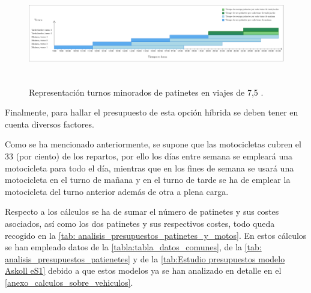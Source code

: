 \begin{figure}[H]
    \centering
    \includegraphics[width= \textwidth, height=12em]{archivos/caso1_patinetes.pdf}
    \caption{Representación turnos minorados de patinetes en viajes de 7,5 .}
    \label{fig:patinetes_caso2_2}
\end{figure}

Finalmente, para hallar el presupuesto de esta opción híbrida se deben tener en cuenta diversos factores. 

Como se ha mencionado anteriormente, se supone  que las motocicletas cubren el 33 (por ciento) de los repartos, por ello los días entre semana se empleará una motocicleta para todo el día, mientras que en los fines de semana se usará una motocicleta en el turno de mañana y en el turno de tarde se ha de emplear la motocicleta del turno anterior además de otra a plena carga.

Respecto a los cálculos se ha de sumar el número de patinetes y sus costes asociados, así como los dos patinetes y sus respectivos costes, todo queda recogido en la \autoref{tab: analisis_presupuestos_patinetes_y_motos}. En estos cálculos se han empleado datos de la \autoref{tabla:tabla_datos_comunes}, de la \autoref{tab: analisis_presupuestos_patienetes} y de la \autoref{tab:Estudio presupuestos modelo Askoll eS1} debido a que estos modelos ya se han analizado en detalle en el \autoref{anexo_calculos_sobre_vehiculos}.

